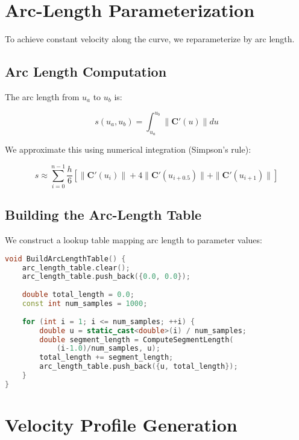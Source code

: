 \documentclass[11pt]{article}
\begin{document}
\section{Arc-Length Parameterization}

To achieve constant velocity along the curve, we reparameterize by arc length.

\subsection{Arc Length Computation}

The arc length from $u_a$ to $u_b$ is:

\begin{equation}
s(u_a, u_b) = \int_{u_a}^{u_b} \|\mathbf{C}'(u)\| du
\end{equation}

We approximate this using numerical integration (Simpson's rule):

\begin{equation}
s \approx \sum_{i=0}^{n-1} \frac{h}{6} \left[ \|\mathbf{C}'(u_i)\| + 4\|\mathbf{C}'(u_{i+0.5})\| + \|\mathbf{C}'(u_{i+1})\| \right]
\end{equation}

\subsection{Building the Arc-Length Table}

We construct a lookup table mapping arc length to parameter values:

\begin{lstlisting}[language=C++, caption=Arc-Length Table Construction]
void BuildArcLengthTable() {
    arc_length_table.clear();
    arc_length_table.push_back({0.0, 0.0});
    
    double total_length = 0.0;
    const int num_samples = 1000;
    
    for (int i = 1; i <= num_samples; ++i) {
        double u = static_cast<double>(i) / num_samples;
        double segment_length = ComputeSegmentLength(
            (i-1.0)/num_samples, u);
        total_length += segment_length;
        arc_length_table.push_back({u, total_length});
    }
}
\end{lstlisting}

\section{Velocity Profile Generation}
\end{document}
